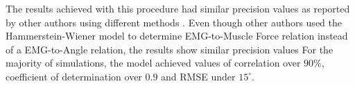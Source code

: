 \documentclass[letterpaper, 10 pt, conference]{ieeeconf}  %
\begin{document}
\addtolength{\textheight}{-4cm}   %













The results achieved with this procedure had similar precision values as reported by other authors using different methods \cite{Rahmatian2016158,Mamikoglu2016785,Pang2015165,Liu1999391}. Even though other authors used the Hammerstein-Wiener model to determine EMG-to-Muscle Force relation instead of a EMG-to-Angle relation, the results show similar precision values \cite{Abbasi-Asl2011,sab2010,clancy2012}
For the majority of simulations, the model achieved values of correlation over $90\%$, coefficient of determination over $0.9$ and RMSE under $15^\circ$.



\end{document}
